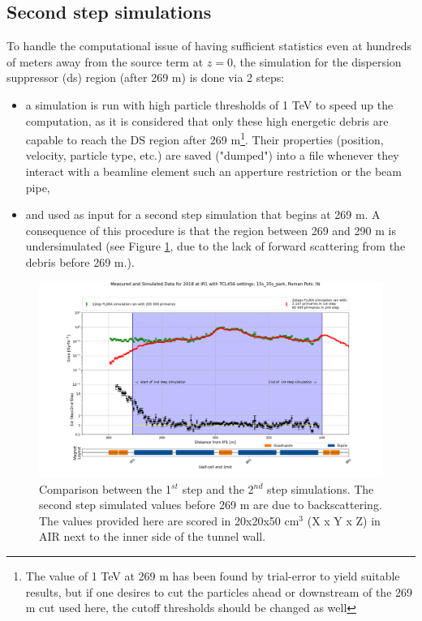 \documentclass[encoding=utf8,british]{tumphthesis}
\begin{document}
\subsection{Second step simulations}
\label{subsection:second-step-LHC}

To handle the computational issue of having sufficient statistics even at hundreds of meters away from the source term at $z=0$, the simulation for the dispersion suppressor (\acrshort{ds}) region (after 269 m) is done via 2 steps: 

\begin{itemize}
    \item a simulation is run with high particle thresholds of 1 TeV to speed up the computation, as it is considered that only these high energetic debris are capable to reach the DS region after 269 m\footnote{The value of 1 TeV at 269 m has been found by trial-error to yield suitable results, but if one desires to cut the particles ahead or downstream of the 269 m cut used here, the cutoff thresholds should be changed as well}. Their properties (position, velocity, particle type, etc.) are saved ("dumped") into a file whenever they interact with a beamline element such an apperture restriction or the beam pipe,
    
    \item  and used as input for a second step simulation that begins at 269 m. A consequence of this procedure is that the region between 269 and 290 m is undersimulated (see Figure \ref{fig:1step-vs-2step}, due to the lack of forward scattering from the debris before 269 m.).

\end{itemize}


\begin{figure}[H]
    \centering
    \includegraphics[width=1.0\linewidth]{results/comparison_1step_vs_2step.png}
    \caption{Comparison between the 1$^{st}$ step and the 2$^{nd}$ step simulations. The second step simulated values before 269 m are due to backscattering. The values provided here are scored in 20x20x50 cm$^{3}$ (X x Y x Z) in AIR next to the inner side of the tunnel wall.}
    \label{fig:1step-vs-2step}
\end{figure}
\end{document}
